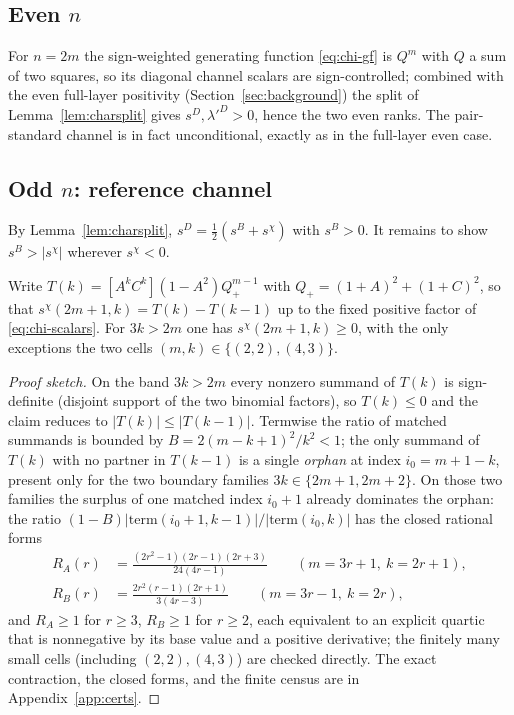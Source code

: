 \subsection{Even \texorpdfstring{$n$}{n}}

For $n=2m$ the sign-weighted generating function \eqref{eq:chi-gf} is $Q^{m}$ with $Q$ a sum of two squares, so its
diagonal channel scalars are sign-controlled; combined with the even full-layer positivity
(Section~\ref{sec:background}) the split of Lemma~\ref{lem:charsplit} gives $s^{D},\lambda'^{D}>0$, hence the two even
ranks.  The pair-standard channel is in fact unconditional, exactly as in the full-layer even case.

\subsection{Odd \texorpdfstring{$n$}{n}: reference channel}

By Lemma~\ref{lem:charsplit}, $s^{D}=\tfrac12(s^{B}+s^{\chi})$ with $s^{B}>0$.  It remains to show
$s^{B}>\lvert s^{\chi}\rvert$ wherever $s^{\chi}<0$.

\begin{lemma}\label{lem:signloc}
Write $T(k)=[A^kC^k](1-A^2)Q^{m-1}_{+}$ with $Q_+=(1+A)^2+(1+C)^2$, so that
$s^{\chi}(2m+1,k)=T(k)-T(k-1)$ up to the fixed positive factor of \eqref{eq:chi-scalars}.  For $3k>2m$ one has
$s^{\chi}(2m+1,k)\ge0$, with the only exceptions the two cells $(m,k)\in\{(2,2),(4,3)\}$.
\end{lemma}

\begin{proof}[Proof sketch]
On the band $3k>2m$ every nonzero summand of $T(k)$ is sign-definite (disjoint support of the two binomial factors),
so $T(k)\le0$ and the claim reduces to $\lvert T(k)\rvert\le\lvert T(k-1)\rvert$.  Termwise the ratio of matched
summands is bounded by $B=2(m-k+1)^2/k^2<1$; the only summand of $T(k)$ with no partner in $T(k-1)$ is a single
\emph{orphan} at index $i_0=m+1-k$, present only for the two boundary families $3k\in\{2m+1,2m+2\}$.  On those two
families the surplus of one matched index $i_0+1$ already dominates the orphan: the ratio
$(1-B)\lvert\text{term}(i_0+1,k-1)\rvert/\lvert\text{term}(i_0,k)\rvert$ has the closed rational forms
\begin{align*}
  R_A(r)&=\frac{(2r^2-1)(2r-1)(2r+3)}{24(4r-1)}\qquad(m=3r+1,\ k=2r+1),\\
  R_B(r)&=\frac{2r^2(r-1)(2r+1)}{3(4r-3)}\qquad(m=3r-1,\ k=2r),
\end{align*}
and $R_A\ge1$ for $r\ge3$, $R_B\ge1$ for $r\ge2$, each equivalent to an explicit quartic that is nonnegative by its
base value and a positive derivative; the finitely many small cells (including $(2,2),(4,3)$) are checked directly.
The exact contraction, the closed forms, and the finite census are in Appendix~\ref{app:certs}.
\end{proof}

